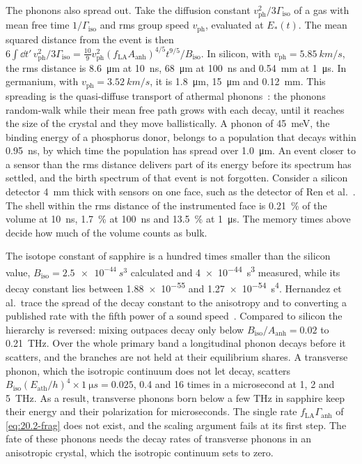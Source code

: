 The phonons also spread out. Take the diffusion constant $v_{\mathrm{ph}}^2/3\varGamma_{\mathrm{iso}}$ of a gas with mean free time $1/\varGamma_{\mathrm{iso}}$ and rms group speed $v_{\mathrm{ph}}$, evaluated at $E_*(t)$. The mean squared distance from the event is then $6\int\dd t'\,v_{\mathrm{ph}}^2/3\varGamma_{\mathrm{iso}} = \frac{10}{9}v_{\mathrm{ph}}^2(f_{\mathrm{LA}}A_{\mathrm{anh}})^{4/5}t^{9/5}/B_{\mathrm{iso}}$. In silicon, with $v_{\mathrm{ph}} = \SI{5.85}{km/s}$, the rms distance is \SI{8.6}{\micro m} at \SI{10}{ns}, \SI{68}{\micro m} at \SI{100}{ns} and \SI{0.54}{mm} at \SI{1}{\micro s}. In germanium, with $v_{\mathrm{ph}} = \SI{3.52}{km/s}$, it is \SI{1.8}{\micro m}, \SI{15}{\micro m} and \SI{0.12}{mm}. This spreading is the quasi-diffuse transport of athermal phonons~\cite[Sect.~2.2.2]{kelsey2023g4cmp}: the phonons random-walk while their mean free path grows with each decay, until it reaches the size of the crystal and they move ballistically. A phonon of \SI{45}{meV}, the binding energy of a phosphorus donor, belongs to a population that decays within \SI{0.95}{ns}, by which time the population has spread over \SI{1.0}{\micro m}. An event closer to a sensor than the rms distance delivers part of its energy before its spectrum has settled, and the birth spectrum of that event is not forgotten. Consider a silicon detector \SI{4}{mm} thick with sensors on one face, such as the detector of Ren et al.~\cite{ren2021design}. The shell within the rms distance of the instrumented face is \SI{0.21}{\percent} of the volume at \SI{10}{ns}, \SI{1.7}{\percent} at \SI{100}{ns} and \SI{13.5}{\percent} at \SI{1}{\micro s}. The memory times above decide how much of the volume counts as bulk.

The isotope constant of sapphire is a hundred times smaller than the silicon value, $B_{\mathrm{iso}} = \SI{2.5e-44}{s^3}$ calculated and \SI{4e-44}{s^3} measured, while its decay constant lies between \num{1.88e-55} and \SI{1.27e-54}{s^4}. Hernandez et al.\ trace the spread of the decay constant to the anisotropy and to converting a published rate with the fifth power of a sound speed~\cite[Tables~3, 4]{hernandez2025modeling}. Compared to silicon the hierarchy is reversed: mixing outpaces decay only below $B_{\mathrm{iso}}/A_{\mathrm{anh}} = 0.02$ to \SI{0.21}{THz}. Over the whole primary band a longitudinal phonon decays before it scatters, and the branches are not held at their equilibrium shares. A transverse phonon, which the isotropic continuum does not let decay, scatters $B_{\mathrm{iso}}(E_{\mathrm{ath}}/h)^4\times\SI{1}{\micro s} = 0.025$, 0.4 and 16 times in a microsecond at 1, 2 and \SI{5}{THz}. As a result, transverse phonons born below a few THz in sapphire keep their energy and their polarization for microseconds. The single rate $f_{\mathrm{LA}}\varGamma_{\mathrm{anh}}$ of \cref{eq:20.2-frag} does not exist, and the scaling argument fails at its first step. The fate of these phonons needs the decay rates of transverse phonons in an anisotropic crystal, which the isotropic continuum sets to zero.

